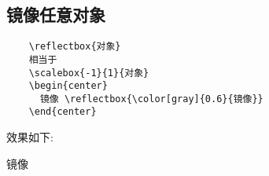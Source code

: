 \subsection{镜像任意对象}

\begin{shaded}
  \begin{Verbatim}
    \reflectbox{对象}
    相当于
    \scalebox{-1}{1}{对象}
    \begin{center}
      镜像 \reflectbox{\color[gray]{0.6}{镜像}}
    \end{center}
  \end{Verbatim}
\end{shaded}

效果如下:
\begin{shaded}
    \begin{center}
      镜像 
    \end{center}
\end{shaded}


